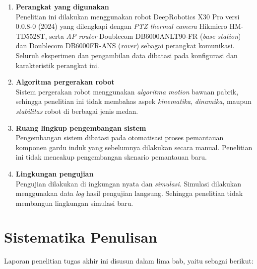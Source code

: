 \begin{enumerate}
    \item\textbf{Perangkat yang digunakan} \\
    Penelitian ini dilakukan menggunakan robot DeepRobotics X30 Pro versi 0.0.8-0 (2024) yang dilengkapi dengan \emph{ PTZ thermal camera} Hikmicro HM-TD5528T, serta \emph{AP router} Doublecom DB6000ANLT90-FR (\emph{base station}) dan Doublecom DB6000FR-ANS (\emph{rover}) sebagai perangkat komunikasi. Seluruh eksperimen dan pengambilan data dibatasi pada konfigurasi dan karakteristik perangkat ini.
    
    \item \textbf{Algoritma pergerakan robot} \\
    Sistem pergerakan robot menggunakan \emph{algoritma motion} bawaan pabrik, sehingga penelitian ini tidak membahas aspek \emph{kinematika}, \emph{dinamika}, maupun \emph{stabilitas} robot di berbagai jenis medan.

    \item \textbf{Ruang lingkup pengembangan sistem} \\
    Pengembangan sistem dibatasi pada otomatisasi proses pemantauan komponen gardu induk yang sebelumnya dilakukan secara manual. Penelitian ini tidak mencakup pengembangan skenario pemantauan baru.

    \item \textbf{Lingkungan pengujian} \\
    Pengujian dilakukan di ingkungan nyata dan \emph{simulasi}. Simulasi dilakukan menggunakan data \emph{log} hasil pengujian langsung. Sehingga penelitian tidak membangun lingkungan simulasi baru.
\end{enumerate}



\section{Sistematika Penulisan}
\label{sec:sistematikapenulisan}

Laporan penelitian tugas akhir ini disusun dalam lima bab, yaitu sebagai berikut:

